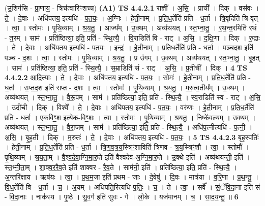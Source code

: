 \documentclass[17pt]{extarticle}
\begin{document}
                  \newline
                      (उ॒शिग॑सि - प्रा॒णाय॒ - त्रिच॑त्वारिꣳशच्च)  \textbf{(A1)} \newline \newline
                                \textbf{ TS 4.4.2.1} \newline
                  राज्ञी᳚ । अ॒सि॒ । प्राची᳚ । दिक् । वस॑वः । ते॒ । दे॒वाः । अधि॑पतय॒ इत्यधि॑ - प॒त॒यः॒ । अ॒ग्निः । हे॒ती॒नाम् । प्र॒ति॒ध॒र्तेति॑ प्रति - ध॒र्ता । त्रि॒वृदिति॑ त्रि-वृत् । त्वा॒ । स्तोमः॑ । पृ॒थि॒व्याम् । श्र॒य॒तु॒ । आज्य᳚म् । उ॒क्थम् । अव्य॑थयत् । स्त॒भ्ना॒तु॒ । र॒थ॒न्त॒रमिति॑ रथं - त॒रम् । साम॑ । प्रति॑ष्ठित्या॒ इति॒ प्रति॑ - स्थि॒त्यै॒ । वि॒राडिति॑ वि - राट् । अ॒सि॒ । द॒क्षि॒णा । दिक् । रु॒द्राः । ते॒ । दे॒वाः । अधि॑पतय॒ इत्यधि॑ - प॒त॒यः॒ । इन्द्रः॑ । हे॒ती॒नाम् । प्र॒ति॒ध॒र्तेति॑ प्रति - ध॒र्ता । प॒ञ्च॒द॒श इति॑ पञ्च - द॒शः । त्वा॒ । स्तोमः॑ । पृ॒थि॒व्याम् । श्र॒य॒तु॒ । प्र उ॑गम् । उ॒क्थम् । अव्य॑थयत् । स्त॒भ्ना॒तु॒ । बृ॒हत् । साम॑ । प्रति॑ष्ठित्या॒ इति॒ प्रति॑ - स्थि॒त्यै॒ । स॒म्राडिति॑ सं - राट् । अ॒सि॒ । प्र॒तीची᳚ । दिक् । \textbf{  4} \newline
                  \newline
                                \textbf{ TS 4.4.2.2} \newline
                  आ॒दि॒त्याः । ते॒ । दे॒वाः । अधि॑पतय॒ इत्यधि॑ - प॒त॒यः॒ । सोमः॑ । हे॒ती॒नाम् । प्र॒ति॒ध॒र्तेति॑ प्रति - ध॒र्ता । स॒प्त॒द॒श इति॑ सप्त - द॒शः । त्वा॒ । स्तोमः॑ । पृ॒थि॒व्याम् । श्र॒य॒तु॒ । म॒रु॒त्व॒तीय᳚म् । उ॒क्थम् । अव्य॑थयत् । स्त॒भ्ना॒तु॒ । वै॒रू॒पम् । साम॑ । प्रति॑ष्ठित्या॒ इति॒ प्रति॑ - स्थि॒त्यै॒ । स्व॒राडिति॑ स्व - राट् । अ॒सि॒ । उदी॑ची । दिक् । विश्वे᳚ । ते॒ । दे॒वाः । अधि॑पतय॒ इत्यधि॑ - प॒त॒यः॒ । वरु॑णः । हे॒ती॒नाम् । प्र॒ति॒ध॒र्तेति॑ प्रति - ध॒र्ता । ए॒क॒विꣳ॒॒श इत्ये॑क-विꣳ॒॒शः । त्वा॒ । स्तोमः॑ । पृ॒थि॒व्याम् । श्र॒य॒तु॒ । निष्के॑वल्यम् । उ॒क्थम् । अव्य॑थयत् । स्त॒भ्ना॒तु॒ । वै॒रा॒जम् । साम॑ । प्रति॑ष्ठित्या॒ इति॒ प्रति॑ - स्थि॒त्यै॒ । अधि॑प॒त्नीत्यधि॑ - प॒त्नी॒ । अ॒सि॒ । बृ॒ह॒ती । दिक् । म॒रुतः॑ । ते॒ । दे॒वाः । अधि॑पतय॒ इत्यधि॑ - प॒त॒यः॒ । \textbf{  5} \newline
                  \newline
                                \textbf{ TS 4.4.2.3} \newline
                  बृह॒स्पतिः॑ । हे॒ती॒नाम् । प्र॒ति॒ध॒र्तेति॑ प्रति - ध॒र्ता । त्रि॒ण॒व॒त्र॒य॒स्त्रिꣳ॒॒शाविति॑ त्रिणव - त्र॒य॒स्त्रिꣳ॒॒शौ । त्वा॒ । स्तोमौ᳚ । पृ॒थि॒व्याम् । श्र॒य॒ता॒म् । वै॒श्व॒दे॒वा॒ग्नि॒मा॒रु॒ते इति॑ वैश्वदेव-अ॒ग्नि॒मा॒रु॒ते । उ॒क्थे इति॑ । अव्य॑थयन्ती॒ इति॑ । स्त॒भ्नी॒ता॒म् । शा॒क्व॒र॒रै॒व॒ते इति॑ शाक्वर - रै॒व॒ते । साम॑नी॒ इति॑ । प्रति॑ष्ठित्या॒ इति॒ प्रति॑ - स्थि॒त्यै॒ । अ॒न्तरि॑क्षाय । ऋष॑यः । त्वा॒ । प्र॒थ॒म॒जा इति॑ प्रथम - जाः । दे॒वेषु॑ । दि॒वः । मात्र॑या । व॒रि॒णा । प्र॒थ॒न्तु॒ । वि॒ध॒र्तेति॑ वि - ध॒र्ता । च॒ । अ॒यम् । अधि॑पति॒रित्यधि॑-प॒तिः॒ । च॒ । ते । त्वा॒ । सर्वे᳚ । सं॒ॅवि॒दा॒ना इति॑ सं - वि॒दा॒नाः । नाक॑स्य । पृ॒ष्ठे । सु॒व॒र्ग इति॑ सुवः - गे । लो॒के । यज॑मानम् । च॒ । सा॒द॒य॒न्तु॒ ॥ \textbf{  6 } \newline
\end{document}
